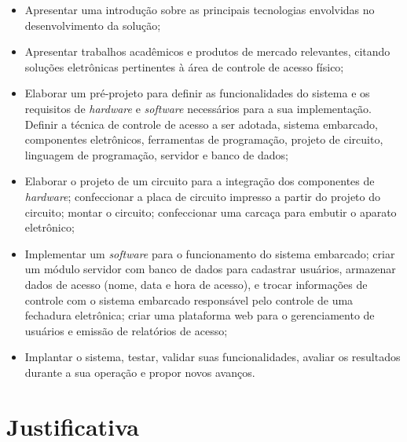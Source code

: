 \begin{itemize}
   
   
  \item  Apresentar uma introdução sobre as principais tecnologias envolvidas no desenvolvimento da solução;

  \item  Apresentar trabalhos acadêmicos e produtos de mercado relevantes, citando soluções eletrônicas pertinentes à área de controle de acesso físico;
  
  \item Elaborar um pré-projeto para definir as funcionalidades do sistema e os requisitos de \textit{hardware} e \textit{software} necessários para a sua implementação. Definir a técnica de controle de acesso a ser adotada, sistema embarcado, componentes eletrônicos, ferramentas de programação, projeto de circuito, linguagem de programação, servidor e banco de dados;
  
  \item Elaborar o projeto de um circuito para a integração dos componentes de \textit{hardware}; confeccionar a placa de circuito impresso a partir do projeto do circuito; montar o circuito; confeccionar uma carcaça para embutir o aparato eletrônico;

  \item Implementar um \textit{software} para o funcionamento do sistema embarcado; criar um módulo servidor com banco de dados para cadastrar usuários, armazenar dados de acesso (nome, data e hora de acesso), e trocar informações de controle com o sistema embarcado responsável pelo controle de uma fechadura eletrônica; criar uma plataforma web para o gerenciamento de usuários e emissão de relatórios de acesso;
  
  \item Implantar o sistema, testar, validar suas funcionalidades, avaliar os resultados durante a sua operação e propor novos avanços.
  
\end{itemize}



\section{Justificativa}



